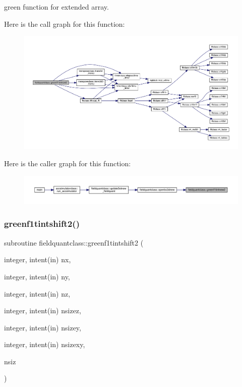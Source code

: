 green function for extended array. 

Here is the call graph for this function\+:
\nopagebreak
\begin{figure}[H]
\begin{center}
\leavevmode
\includegraphics[width=350pt]{namespacefieldquantclass_a32715398e47b9a73bd6cde1ae980e0a3_cgraph}
\end{center}
\end{figure}
Here is the caller graph for this function\+:\nopagebreak
\begin{figure}[H]
\begin{center}
\leavevmode
\includegraphics[width=350pt]{namespacefieldquantclass_a32715398e47b9a73bd6cde1ae980e0a3_icgraph}
\end{center}
\end{figure}
\mbox{\label{namespacefieldquantclass_a25df6116d62bb56b5711333426dcd74d}} 
\subsubsection{\texorpdfstring{greenf1tintshift2()}{greenf1tintshift2()}}
{\footnotesize\ttfamily subroutine fieldquantclass\+::greenf1tintshift2 (\begin{DoxyParamCaption}\item[{integer, intent(in)}]{nx,  }\item[{integer, intent(in)}]{ny,  }\item[{integer, intent(in)}]{nz,  }\item[{integer, intent(in)}]{nsizez,  }\item[{integer, intent(in)}]{nsizey,  }\item[{integer, intent(in)}]{nsizexy,  }\item[{}]{nsiz }\end{DoxyParamCaption})}



